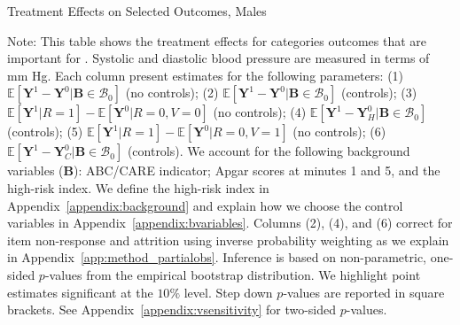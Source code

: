 \begin{table}
\centering
\begin{threeparttable}
\caption{Treatment Effects on Selected Outcomes, Males}\label{table:tescombinedmales}
\begin{scriptsize}

\end{scriptsize}
\begin{tablenotes}
\scriptsize
Note: This table shows the treatment effects for categories outcomes that are important for \citet{Garcia_Heckman_Leaf_etal_2017_Comp_CBA_Unpublished}. Systolic and diastolic blood pressure are measured in terms of mm Hg. Each column present estimates for the following parameters: (1) $\mathbb{E} \left [ \bm{Y}^1 -  \bm{Y}^0 | \bm{B} \in \mathcal{B}_{0} \right]$ (no controls); (2) $\mathbb{E} \left [ \bm{Y}^1 -  \bm{Y}^0 | \bm{B} \in \mathcal{B}_{0} \right]$ (controls); (3) $\mathbb{E} \left [ \bm{Y}^1 | R = 1 \right] -  \mathbb{E} \left [ \bm{Y}^0 | R = 0,V = 0  \right]$ (no controls); (4) $\mathbb{E} \left [ \bm{Y}^1 -  \bm{Y}_H^0 | \bm{B} \in \mathcal{B}_{0} \right]$ (controls); (5) $\mathbb{E} \left [ \bm{Y}^1 | R = 1 \right] -  \mathbb{E} \left [ \bm{Y}^0 | R = 0,V = 1 \right]$ (no controls); (6) $\mathbb{E} \left [ \bm{Y}^1 -  \bm{Y}_C^0 | \bm{B} \in \mathcal{B}_{0} \right]$ (controls). We account for the following background variables ($\bm{B}$): ABC/CARE indicator; Apgar scores at minutes 1 and 5, and the high-risk index. We define the high-risk index in Appendix~\ref{appendix:background} and explain how we choose the control variables in Appendix~\ref{appendix:bvariables}. Columns (2), (4), and (6) correct for item non-response and attrition using inverse probability weighting as we explain in Appendix~\ref{app:method_partialobs}. Inference is based on non-parametric, one-sided $p$-values from the empirical bootstrap distribution. We highlight point estimates significant at the $10\%$ level. Step down $p$-values are reported in square brackets. See Appendix~\ref{appendix:vsensitivity} for two-sided $p$-values.\\
\end{tablenotes}
\end{threeparttable}
\end{table}
\doublespacing

